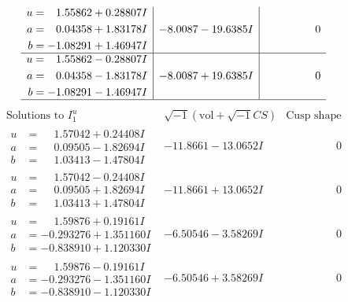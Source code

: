 \documentclass[1p]{elsarticle_modified}
\theoremstyle{definition}
\newcommand{\I}{\sqrt{-1}}
\begin{document}
$$\begin{array}{c|c|c}
\begin{aligned}
u &= \phantom{-}1.55862 + 0.28807 I \\
a &= \phantom{-}0.04358 + 1.83178 I \\
b &= -1.08291 + 1.46947 I\end{aligned}
 & -8.0087 - 19.6385 I & \phantom{-0.000000 } 0 \\ \hline\begin{aligned}
u &= \phantom{-}1.55862 - 0.28807 I \\
a &= \phantom{-}0.04358 - 1.83178 I \\
b &= -1.08291 - 1.46947 I\end{aligned}
 & -8.0087 + 19.6385 I & \phantom{-0.000000 } 0\\
 \hline 
 \end{array}$$\newpage$$\begin{array}{c|c|c}  
\text{Solutions to }I^u_{1}& \I (\text{vol} + \sqrt{-1}CS) & \text{Cusp shape}\\
 \hline 
\begin{aligned}
u &= \phantom{-}1.57042 + 0.24408 I \\
a &= \phantom{-}0.09505 - 1.82694 I \\
b &= \phantom{-}1.03413 - 1.47804 I\end{aligned}
 & -11.8661 - 13.0652 I & \phantom{-0.000000 } 0 \\ \hline\begin{aligned}
u &= \phantom{-}1.57042 - 0.24408 I \\
a &= \phantom{-}0.09505 + 1.82694 I \\
b &= \phantom{-}1.03413 + 1.47804 I\end{aligned}
 & -11.8661 + 13.0652 I & \phantom{-0.000000 } 0 \\ \hline\begin{aligned}
u &= \phantom{-}1.59876 + 0.19161 I \\
a &= -0.293276 + 1.351160 I \\
b &= -0.838910 + 1.120330 I\end{aligned}
 & -6.50546 - 3.58269 I & \phantom{-0.000000 } 0 \\ \hline\begin{aligned}
u &= \phantom{-}1.59876 - 0.19161 I \\
a &= -0.293276 - 1.351160 I \\
b &= -0.838910 - 1.120330 I\end{aligned}
 & -6.50546 + 3.58269 I & \phantom{-0.000000 } 0 \\ \hline\begin{aligned}

\end{aligned}
\end{array}$$
\end{document}

